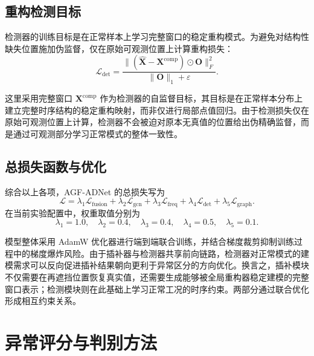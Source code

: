 \documentclass[bachelor, vlined]{DissertUESTC}
\begin{document}
    \subsection{重构检测目标}
    
    检测器的训练目标是在正常样本上学习完整窗口的稳定重构模式。为避免对结构性缺失位置施加伪监督，仅在原始可观测位置上计算重构损失：
    \begin{equation}
        \mathcal{L}_{\mathrm{det}}
        =
        \frac{\|(\hat{\mathbf{X}}-\mathbf{X}^{\mathrm{comp}}) \odot \mathbf{O}\|_F^2}{\|\mathbf{O}\|_1 + \varepsilon}.
    \end{equation}
    
    这里采用完整窗口 $\mathbf{X}^{\mathrm{comp}}$ 作为检测器的自监督目标，其目标是在正常样本分布上建立完整时序结构的稳定重构映射，而非仅进行局部点值回归。由于检测损失仅在原始可观测位置上计算，检测器不会被迫对原本无真值的位置给出伪精确监督，而是通过可观测部分学习正常模式的整体一致性。
    
    \subsection{总损失函数与优化}
    
    综合以上各项，AGF-ADNet 的总损失写为
    \begin{equation}
        \mathcal{L}
        =
        \lambda_1 \mathcal{L}_{\mathrm{fusion}}
        +
        \lambda_2 \mathcal{L}_{\mathrm{gcn}}
        +
        \lambda_3 \mathcal{L}_{\mathrm{freq}}
        +
        \lambda_4 \mathcal{L}_{\mathrm{det}}
        +
        \lambda_5 \mathcal{L}_{\mathrm{graph}}.
    \end{equation}
    在当前实验配置中，权重取值分别为
    \begin{equation}
        \lambda_1 = 1.0, \quad
        \lambda_2 = 0.4, \quad
        \lambda_3 = 0.4, \quad
        \lambda_4 = 0.5, \quad
        \lambda_5 = 0.1.
    \end{equation}
    
    模型整体采用 AdamW 优化器进行端到端联合训练，并结合梯度裁剪抑制训练过程中的梯度爆炸风险。由于插补器与检测器共享前向链路，检测器对正常模式的建模需求可以反向促进插补结果朝向更利于异常区分的方向优化。换言之，插补模块不仅需要在再遮挡位置恢复真实值，还需要生成能够被全局重构器稳定建模的完整窗口表示；检测模块则在此基础上学习正常工况的时序约束。两部分通过联合优化形成相互约束关系。
    
    \section{异常评分与判别方法}
    
\end{document}
